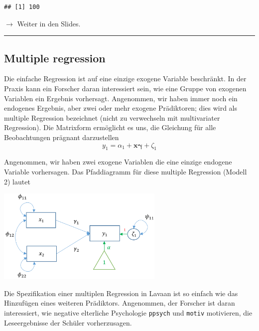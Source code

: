 \documentclass[
]{article}
\newenvironment{Shaded}{\begin{snugshade}}{\end{snugshade}}
\newcommand{\FunctionTok}[1]{\textcolor[rgb]{0.00,0.00,0.00}{#1}}
\newcommand{\NormalTok}[1]{#1}
\newcommand{\SpecialCharTok}[1]{\textcolor[rgb]{0.00,0.00,0.00}{#1}}
\begin{document}
\begin{Shaded}
\end{Shaded}

\begin{verbatim}
## [1] 100
\end{verbatim}

\(\rightarrow\) Weiter in den Slides.

\begin{center}\rule{0.5\linewidth}{0.5pt}\end{center}

\hypertarget{multiple-regression}{%
\subsection{Multiple regression}\label{multiple-regression}}

Die einfache Regression ist auf eine einzige exogene Variable
beschränkt. In der Praxis kann ein Forscher daran interessiert sein, wie
eine Gruppe von exogenen Variablen ein Ergebnis vorhersagt. Angenommen,
wir haben immer noch ein endogenes Ergebnis, aber zwei oder mehr exogene
Prädiktoren; dies wird als multiple Regression bezeichnet (nicht zu
verwechseln mit multivariater Regression). Die Matrixform ermöglicht es
uns, die Gleichung für alle Beobachtungen prägnant darzustellen \[
  y_1 = \alpha_1 + \mathbf{x \gamma} + \zeta_1
\]

Angenommen, wir haben zwei exogene Variablen die eine einzige endogene
Variable vorhersagen. Das Pfaddiagramm für diese multiple Regression
(Modell 2) lautet

\includegraphics[width=0.6\textwidth,height=\textheight]{m2 (1).png}

Die Spezifikation einer multiplen Regression in Lavaan ist so einfach
wie das Hinzufügen eines weiteren Prädiktors. Angenommen, der Forscher
ist daran interessiert, wie negative elterliche Psychologie
\texttt{ppsych} und \texttt{motiv} motivieren, die Leseergebnisse der
Schüler vorherzusagen.
\end{document}
